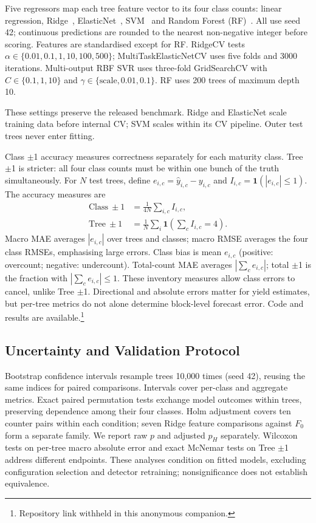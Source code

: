 \documentclass[conference,a4paper]{IEEEtran}
\begin{document}
Five regressors map each tree feature vector to its four class counts: linear regression, Ridge~\cite{ref19},
ElasticNet~\cite{ref17}, SVM~\cite{ref20} and Random Forest (RF)~\cite{ref18}.
All use seed 42; continuous predictions are rounded to the nearest
non-negative integer before scoring. Features are
standardised except for RF. RidgeCV tests
$\alpha\in\{0.01,0.1,1,10,100,500\}$; MultiTaskElasticNetCV uses five folds and
3000 iterations. Multi-output RBF SVR uses three-fold GridSearchCV with
$C\in\{0.1,1,10\}$ and $\gamma\in\{\mathrm{scale},0.01,0.1\}$.
RF uses 200 trees of maximum depth 10.

These settings preserve the released benchmark.
Ridge and ElasticNet scale training data before internal CV; SVM scales within its
CV pipeline. Outer test trees never enter fitting.

Class $\pm$1 accuracy measures correctness separately for each maturity class.
Tree $\pm$1 is stricter: all four class counts must be within one bunch of
the truth simultaneously. For $N$ test trees, define $e_{i,c}=\hat y_{i,c}-y_{i,c}$ and
$I_{i,c}=\mathbf1(|e_{i,c}|\leq1)$. The accuracy measures are
\begin{align}
\mathrm{Class}\ \pm1&=\frac{1}{4N}\sum_{i,c}I_{i,c},\\
\mathrm{Tree}\ \pm1&=\frac{1}{N}\sum_i\mathbf1\!\left(\sum_c I_{i,c}=4\right).
\end{align}
Macro MAE averages $|e_{i,c}|$ over trees and classes; macro RMSE averages
the four class RMSEs, emphasising large errors. Class bias is mean $e_{i,c}$
(positive: overcount; negative: undercount). Total-count MAE averages
$|\sum_c e_{i,c}|$; total $\pm$1 is the fraction with $|\sum_c e_{i,c}|\leq1$.
These inventory measures allow class errors to cancel, unlike Tree $\pm$1.
Directional and absolute errors matter for yield estimates, but per-tree
metrics do not alone determine block-level forecast error. Code and results
are available.\footnote{Repository link withheld in this anonymous companion.}

\subsection{Uncertainty and Validation Protocol}
\label{sec:stats}

Bootstrap confidence intervals resample trees 10,000 times (seed 42), reusing
the same indices for paired comparisons. Intervals cover per-class and aggregate
metrics. Exact paired permutation tests exchange model outcomes within trees,
preserving dependence among their four classes. Holm adjustment covers ten
counter pairs within each condition; seven Ridge feature comparisons against
$F_0$ form a separate family. We report raw $p$ and adjusted $p_H$ separately.
Wilcoxon tests on per-tree macro absolute error and exact McNemar tests on Tree
$\pm$1 address different endpoints. These analyses condition on fitted models,
excluding configuration selection and detector retraining; nonsignificance
does not establish equivalence.
\end{document}
